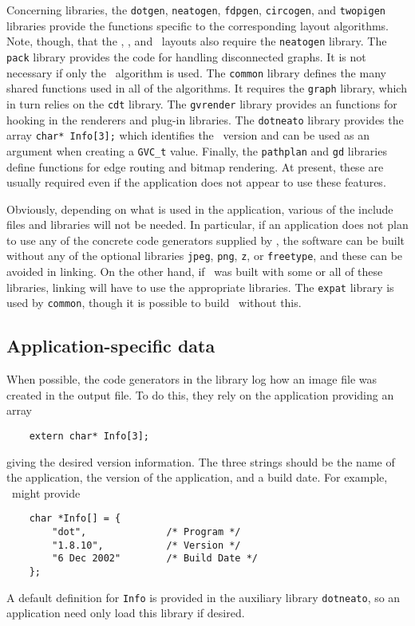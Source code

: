 Concerning libraries, the {\tt dotgen}, {\tt neatogen}, 
{\tt fdpgen}, {\tt circogen}, and {\tt twopigen} libraries provide the functions
specific to the corresponding layout algorithms.
Note, though, that the \twopi, \circo, and \fdp\ layouts also require the
{\tt neatogen} library.
The {\tt pack} library provides the code for
handling disconnected graphs.
It is not necessary if only the \dot\ algorithm is used.
The {\tt common} library defines
the many shared functions used in all of the algorithms. It requires
the {\tt graph} library, which in turn relies on the {\tt cdt} library.
The {\tt gvrender} library provides an functions for hooking in the
renderers and plug-in libraries.
The {\tt dotneato} library provides the array \verb+char* Info[3];+
which identifies the \gviz\ version and can be used as an argument
when creating a {\tt GVC\_t} value.
Finally, the {\tt pathplan} and {\tt gd} libraries define functions
for edge routing and bitmap rendering. At present, these are usually required
even if the application does not appear to use these features.

Obviously, depending on what is used in the application, various of
the include files and libraries will not be needed.
In particular,
if an application does not plan to use any of the concrete code generators
supplied by \gviz, the software can be built without any of the
optional libraries {\tt jpeg}, {\tt png}, {\tt z},
or {\tt freetype}, and these can be avoided in linking. 
On the other hand, if \gviz\ was built with
some or all of these libraries, linking will have to use
the appropriate libraries.
The {\tt expat} library is used by {\tt common}, though it is possible to
build \gviz\ without this. 

\subsection{Application-specific data}
\label{sec:info}

When possible, the code generators in the library log how an image file
was created in the output file. To do this, they rely on 
the application providing an array 
\begin{verbatim}
    extern char* Info[3];
\end{verbatim}
giving the desired version information.
The three strings should be the name of the application, the version
of the application, and a build date. For example, \dot\ might provide
\begin{verbatim}
    char *Info[] = {
        "dot",              /* Program */
        "1.8.10",           /* Version */
        "6 Dec 2002"        /* Build Date */
    };
\end{verbatim}
A default definition for {\tt Info} is provided in the auxiliary library
{\tt dotneato}, so an
application need only load this library if desired.

